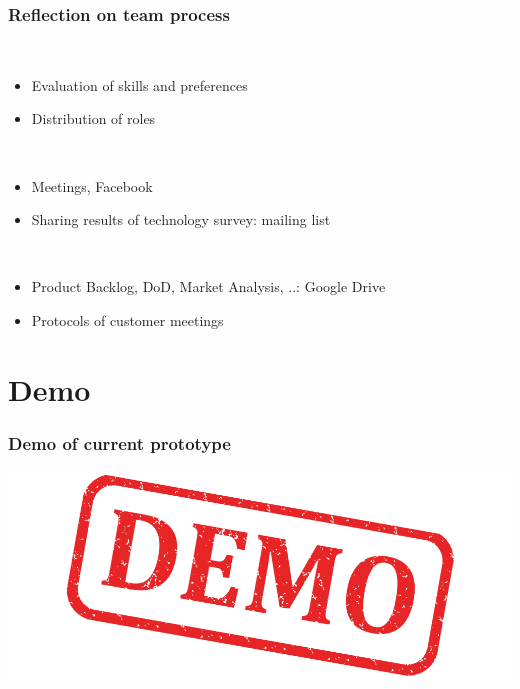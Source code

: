 \begin{frame}
  \frametitle{Reflection on team process}
  \begin{description}[]
    \item[Team member] \hfill \\
    \begin{itemize}
      \item Evaluation of skills and preferences
      \item Distribution of roles
    \end{itemize}
  \end{description}
  \begin{description}[]
    \item[Communication] \hfill \\
    \begin{itemize}
      \item Meetings, Facebook
      \item Sharing results of technology survey: mailing list
    \end{itemize}
  \end{description}
  \begin{description}[]
    \item[Collaborative working] \hfill \\
    \begin{itemize}
      \item Product Backlog, DoD, Market Analysis, ..: Google Drive
      \item Protocols of customer meetings
    \end{itemize}
  \end{description}
\end{frame}

\section{Demo}

\begin{frame}
  \frametitle{Demo of current prototype}
  \includegraphics[width=\textwidth]{images/demo}
\end{frame}


